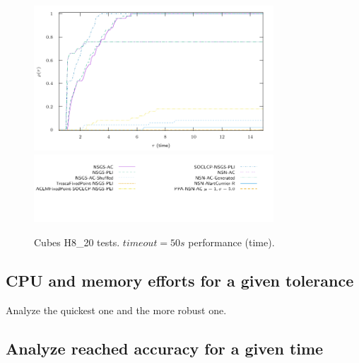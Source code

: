\begin{figure}
  \centering
  \includegraphics[width=0.8\textwidth]{../figure/profile-LMGC_Cubes_H8_20-time_0_100.pdf}
  \includegraphics[width=0.8\textwidth]{../figure/profile-LMGC_Cubes_H8_20_legend-time.pdf}
  \caption{Cubes H8\_20 tests. $timeout=50s $ performance (time). }
  \label{fig:profile-LMGC_Cubes_H8_20-time}
\end{figure}


\subsection{CPU and memory efforts for a given tolerance}

Analyze the quickest one and the more robust one.

\subsection{Analyze reached accuracy for a given time}










